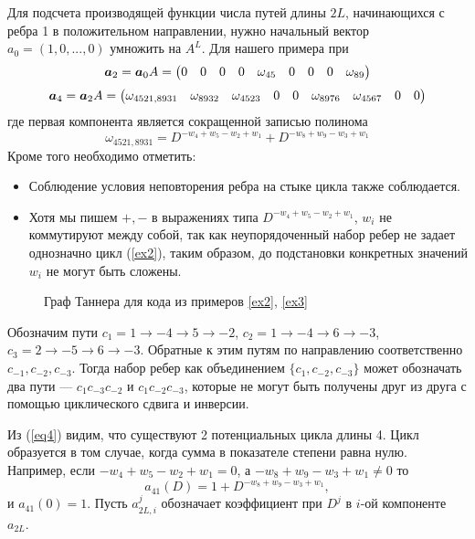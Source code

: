 Для подсчета производящей функции числа путей длины $2L$, начинающихся с ребра 1 в положительном направлении,
нужно начальный вектор $a_0=(1,0,...,0)$ умножить на $A^L$. Для нашего примера при
 \begin{equation}
\boldsymbol{a}_2=\boldsymbol{a}_0 A =
\begin{pmatrix}
     0    & 0 &    0 &    0 &    \omega_{45}   &  0 &    0 &    0 &    \omega_{89}
 \end{pmatrix}
\end{equation} 
\begin{equation}\label{eq4}
 \boldsymbol{a}_4=\boldsymbol{a}_2A=
 \begin{pmatrix}    
    \omega_{4521,8931}  &\omega_{8932} & \omega_{4523 } &0 &    0 &    \omega_{8976}   & \omega_{4567 }&    0 &    0 
 \end{pmatrix}
\end{equation} 
где первая компонента является сокращенной записью полинома
\[
 \omega_{4521,8931}=D^{-w_4+w_5-w_2+w_1}+D^{-w_8+w_9-w_3+w_1}
\]
Кроме того необходимо отметить:
\begin{itemize}
\item 
Соблюдение условия неповторения ребра на стыке цикла также соблюдается.
\item
Хотя мы пишем $+, -$  в выражениях типа $D^{-w_4+w_5-w_2+w_1}$,
$w_i$ не коммутируют между собой, так как неупорядоченный набор ребер не задает однозначно цикл (\ref{ex2}),
 таким образом, до подстановки конкретных значений $w_i$ не могут быть сложены.
\end{itemize}

\begin{figure}[!h]
  \centering
   \caption{Граф Таннера для кода из примеров \ref{ex2}, \ref{ex3}}
  \label{fig1}
\end{figure}

\begin{example} \label{ex2}
  Обозначим пути $c_1=1 \to -4 \to 5 \to -2$, $c_2=1 \to -4 \to 6 \to -3$, $c_3=2 \to -5 \to 6 \to -3$.
 Обратные к этим путям по направлению соответственно $c_{-1}, c_{-2}, c_{-3}$.
 Тогда набор ребер как объединением $\{c_1,c_{-2},c_{-3}\}$ может обозначать два пути --- $c_1c_{-3}c_{-2}$ и 
$c_1c_{-2}c_{-3}$, которые не могут быть получены друг из друга с помощью циклического сдвига и инверсии.
\end{example}

Из (\ref{eq4}) видим, что существуют 2 потенциальных цикла длины 4. 
Цикл образуется в том случае, когда сумма в показателе степени равна нулю. 
Например, если $-w_4+w_5-w_2+w_1=0$, а  $-w_8+w_9-w_3+w_1\neq 0$  то 
\[
a_{41}(D)=1+D^{-w_8+w_9-w_3+w_1}, 
\]
и $a_{41}(0)=1$.
Пусть $a_{2L,i}^{j}$ обозначает коэффициент при $D^j$ в $i$-ой компоненте $a_{2L}$.

